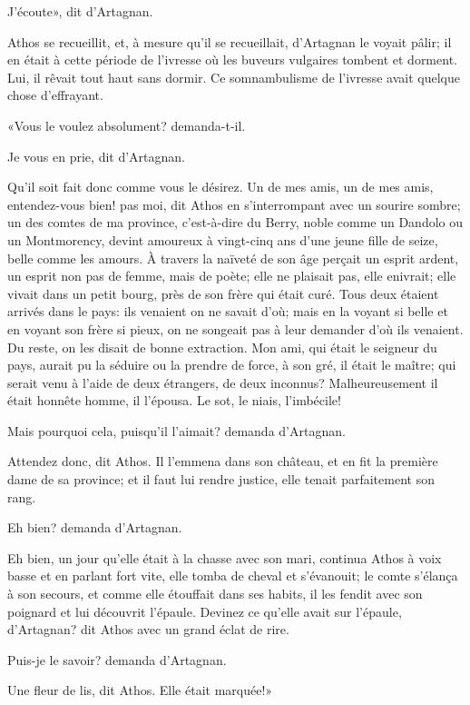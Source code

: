 \speak  J'écoute», dit d'Artagnan. 

Athos se recueillit, et, à mesure qu'il se recueillait, d'Artagnan le voyait pâlir; il en était à cette période de l'ivresse où les buveurs vulgaires tombent et dorment. Lui, il rêvait tout haut sans dormir. Ce somnambulisme de l'ivresse avait quelque chose d'effrayant. 

«Vous le voulez absolument? demanda-t-il. 

\speak  Je vous en prie, dit d'Artagnan. 

\speak  Qu'il soit fait donc comme vous le désirez. Un de mes amis, un de mes amis, entendez-vous bien! pas moi, dit Athos en s'interrompant avec un sourire sombre; un des comtes de ma province, c'est-à-dire du Berry, noble comme un Dandolo ou un Montmorency, devint amoureux à vingt-cinq ans d'une jeune fille de seize, belle comme les amours. À travers la naïveté de son âge perçait un esprit ardent, un esprit non pas de femme, mais de poète; elle ne plaisait pas, elle enivrait; elle vivait dans un petit bourg, près de son frère qui était curé. Tous deux étaient arrivés dans le pays: ils venaient on ne savait d'où; mais en la voyant si belle et en voyant son frère si pieux, on ne songeait pas à leur demander d'où ils venaient. Du reste, on les disait de bonne extraction. Mon ami, qui était le seigneur du pays, aurait pu la séduire ou la prendre de force, à son gré, il était le maître; qui serait venu à l'aide de deux étrangers, de deux inconnus? Malheureusement il était honnête homme, il l'épousa. Le sot, le niais, l'imbécile! 

\speak  Mais pourquoi cela, puisqu'il l'aimait? demanda d'Artagnan. 

\speak  Attendez donc, dit Athos. Il l'emmena dans son château, et en fit la première dame de sa province; et il faut lui rendre justice, elle tenait parfaitement son rang. 

\speak  Eh bien? demanda d'Artagnan. 

\speak  Eh bien, un jour qu'elle était à la chasse avec son mari, continua Athos à voix basse et en parlant fort vite, elle tomba de cheval et s'évanouit; le comte s'élança à son secours, et comme elle étouffait dans ses habits, il les fendit avec son poignard et lui découvrit l'épaule. Devinez ce qu'elle avait sur l'épaule, d'Artagnan? dit Athos avec un grand éclat de rire. 

\speak  Puis-je le savoir? demanda d'Artagnan. 

\speak  Une fleur de lis, dit Athos. Elle était marquée!» 

